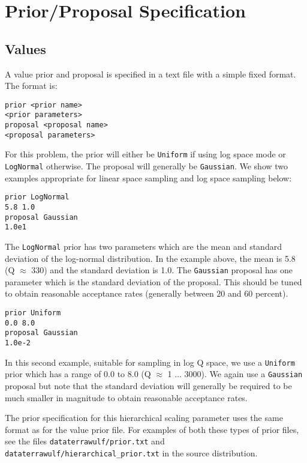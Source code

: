 \documentclass{article}
\begin{document}
\section{Prior/Proposal Specification}

\subsection{Values}

A value prior and proposal is specified in a text file with a simple
fixed format.  The format is:

\begin{verbatim}
prior <prior name>
<prior parameters>
proposal <proposal name>
<proposal parameters>
\end{verbatim}

For this problem, the prior will either be {\tt Uniform} if using log
space mode or {\tt LogNormal} otherwise.  The proposal will generally
be {\tt Gaussian}. We show two examples appropriate for linear space
sampling and log space sampling below:

\begin{verbatim}
prior LogNormal
5.8 1.0
proposal Gaussian
1.0e1
\end{verbatim}

The {\tt LogNormal} prior has two parameters which are the mean and
standard deviation of the log-normal distribution. In the example
above, the mean is 5.8 (Q $\approx$ 330) and the standard deviation is
1.0. The {\tt Gaussian} proposal has one parameter which is the
standard deviation of the proposal. This should be tuned to obtain
reasonable acceptance rates (generally between 20 and 60 percent).


\begin{verbatim}
prior Uniform
0.0 8.0
proposal Gaussian
1.0e-2
\end{verbatim}

In this second example, suitable for sampling in log Q space, we use a
{\tt Uniform} prior which has a range of 0.0 to 8.0 (Q $\approx$ 1
$\ldots$ 3000).  We again use a {\tt Gaussian} proposal but note that
the standard deviation will generally be required to be much smaller
in magnitude to obtain reasonable acceptance rates.

The prior specification for this hierarchical scaling parameter
uses the same format as for the value prior file. For examples of
both these types of prior files, see the files {\tt dataterrawulf/prior.txt}
and {\tt dataterrawulf/hierarchical\_prior.txt} in the source
distribution.
\end{document}
